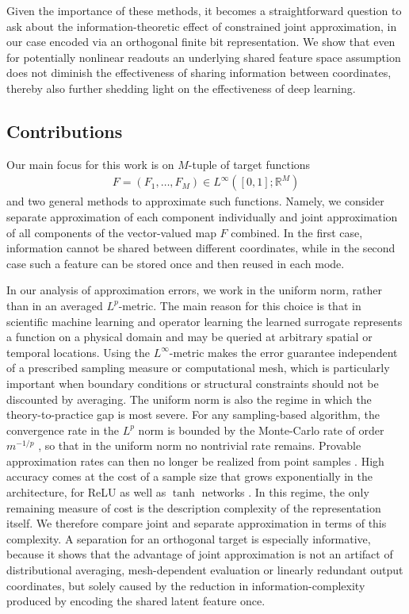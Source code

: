\documentclass[twoside,11pt]{article}
\begin{document}
Given the importance of these methods,
it becomes a straightforward question to ask about the information-theoretic effect of constrained joint approximation,
in our case encoded via an orthogonal finite bit representation.
We show that even for potentially nonlinear readouts an underlying shared feature space assumption does not diminish the effectiveness of sharing information between coordinates,
thereby also further shedding light on the effectiveness of deep learning.

\subsection{Contributions}
Our main focus for this work is on $M$-tuple of target functions
\begin{align}
F = (F_1, \ldots, F_M) \in L^\infty([0,1];\mathbb{R}^M)
\end{align}
and two general methods to approximate such functions.
Namely, we consider separate approximation of each component individually and joint approximation of all components of the vector-valued map $F$ combined.
In the first case, information cannot be shared between different coordinates,
while in the second case such a feature can be stored once and then reused in each mode.

In our analysis of approximation errors, we work in the uniform norm, rather than in an averaged $L^p$-metric.
The main reason for this choice is that in scientific machine learning and operator learning the learned surrogate represents a function on a physical domain and may be queried at arbitrary spatial or temporal locations.
Using the $L^\infty$-metric makes the error guarantee independent of a prescribed sampling measure or computational mesh,
which is particularly important when boundary conditions or structural constraints should not be discounted by averaging. The uniform norm is also the regime in which the theory-to-practice gap is most severe. For any sampling-based algorithm, the convergence rate in the $L^p$ norm is bounded by the Monte-Carlo rate of order $m^{-1/p}$ \citep{Grohs25TheorytoPracticeGapNeural}, so that in the uniform norm no nontrivial rate remains. Provable approximation rates can then no longer be realized from point samples \citep{Grohs24ProofTheorytoPracticeGap}. High accuracy comes at the cost of a sample size that grows exponentially in the architecture, for ReLU as well as $\tanh$ networks \citep{berner2023learning,Grohs26LimitationsLearningTanh}. In this regime, the only remaining measure of cost is the description complexity of the representation itself. We therefore compare joint and separate approximation in terms of this complexity. 
A separation for an orthogonal target is especially informative, because it shows that the advantage of joint approximation is not an artifact of distributional averaging,
mesh-dependent evaluation or linearly redundant output coordinates,
but solely caused by the reduction in information-complexity produced by encoding the shared latent feature once.
\end{document}
